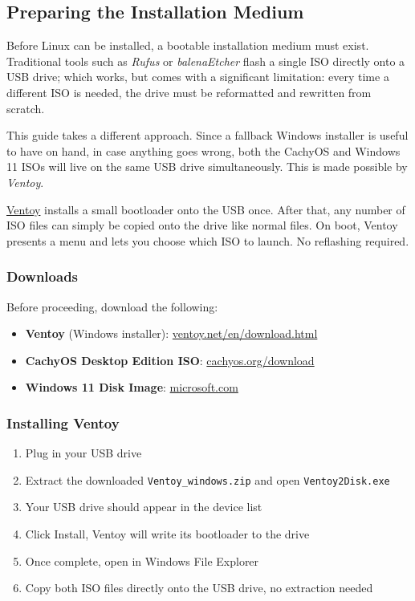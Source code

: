 \documentclass{article}
\newcommand{\code}[1]{\colorbox{codebg}{\texttt{#1}}}
\begin{document}
\subsection{Preparing the Installation Medium}

Before Linux can be installed, a bootable installation medium must exist. Traditional tools such as \textit{Rufus} or \textit{balenaEtcher} flash a single ISO directly onto a USB drive; which works, but comes with a significant limitation: every time a different ISO is needed, the drive must be reformatted and rewritten from scratch.

This guide takes a different approach. Since a fallback Windows installer is useful to have on hand, in case anything goes wrong, both the CachyOS and Windows 11
ISOs will live on the same USB drive simultaneously. This is made possible by \textit{Ventoy}.

\href{https://www.ventoy.net}{Ventoy} installs a small bootloader onto the USB once.
After that, any number of ISO files can simply be copied onto the drive like normal
files. On boot, Ventoy presents a menu and lets you choose which ISO to launch.
No reflashing required.

\subsubsection{Downloads}

Before proceeding, download the following:

\begin{itemize}[nosep, leftmargin=1.5em, label={\tiny\textbullet}]
  \item \textbf{Ventoy} (Windows installer):
    \href{https://www.ventoy.net/en/download.html}{ventoy.net/en/download.html}
  \item \textbf{CachyOS Desktop Edition ISO}:
    \href{https://cachyos.org/download/}{cachyos.org/download}
  \item \textbf{Windows 11 Disk Image}:
    \href{https://www.microsoft.com/en-us/software-download/windows11}{microsoft.com}
\end{itemize}

\subsubsection{Installing Ventoy}

\begin{enumerate}[nosep, leftmargin=1.5em, label={\arabic*.}]
  \item Plug in your USB drive
  \item Extract the downloaded \code{Ventoy\_windows.zip} and open
    \code{Ventoy2Disk.exe}
  \item Your USB drive should appear in the device list
  \item Click Install, Ventoy will write its bootloader to the drive
  \item Once complete, open  in Windows File Explorer
  \item Copy both ISO files directly onto the USB drive, no extraction needed
\end{enumerate}
\end{document}
